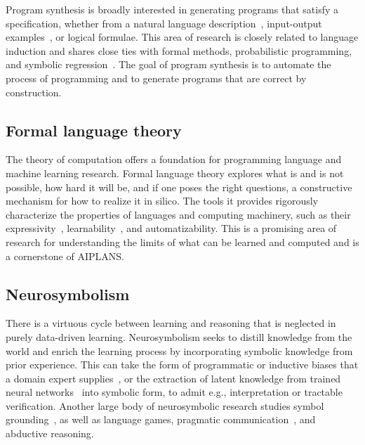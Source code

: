 \documentclass{article}
\begin{document}
Program synthesis is broadly interested in generating programs that satisfy a specification, whether from a natural language description~\cite{acquaviva2022communicating}, input-output examples~\cite{gulwani2011automating}, or logical formulae. This area of research is closely related to language induction and shares close ties with formal methods, probabilistic programming, and symbolic regression~\cite{udrescu2020ai}. The goal of program synthesis is to automate the process of programming and to generate programs that are correct by construction.

\subsection*{Formal language theory}

The theory of computation offers a foundation for programming language and machine learning research. Formal language theory explores what is and is not possible, how hard it will be, and if one poses the right questions, a constructive mechanism for how to realize it in silico. The tools it provides rigorously characterize the properties of languages and computing machinery, such as their expressivity~\cite{chiang2023tighter}, learnability~\cite{lan2024bridging}, and automatizability. This is a promising area of research for understanding the limits of what can be learned and computed and is a cornerstone of AIPLANS.

\subsection*{Neurosymbolism}


There is a virtuous cycle between learning and reasoning that is neglected in purely data-driven learning. Neurosymbolism seeks to distill knowledge from the world and enrich the learning process by incorporating symbolic knowledge from prior experience. This can take the form of programmatic or inductive biases that a domain expert supplies~\cite{faghihi2021domiknows}, or the extraction of latent knowledge from trained neural networks~\cite{weiss2018extracting} into symbolic form, to admit e.g., interpretation or tractable verification. Another large body of neurosymbolic research studies symbol grounding~\cite{topan2021techniques}, as well as language games, pragmatic communication~\cite{pu2020program}, and abductive reasoning.
\end{document}
